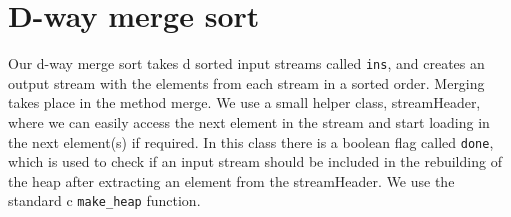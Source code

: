 \section{D-way merge sort}

Our d-way merge sort takes d sorted input streams called \texttt{ins}, and creates an output stream with the elements from each stream in a sorted order. Merging takes place in the method merge. We use a small helper class, streamHeader, where we can easily access the next element in the stream and start loading in the next element(s) if required. In this class there is a boolean flag called \texttt{done}, which is used to check if an input stream should be included in the rebuilding of the heap after extracting an element from the streamHeader.
We use the standard c \texttt{make\_heap} function.



